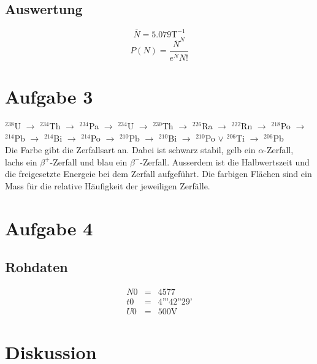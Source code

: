 \documentclass[12pt,a4paper]{article}
\begin{document}
\subsection*{Auswertung}
\[ \overline{N} = 5.079 \mbox{T}^{-1} \]
\[ P(N) = \frac{\overline{N}^N}{e^{\overline{N}}N!} \]

\section*{Aufgabe 3}
$^{238}$U $\rightarrow$  $^{234}$Th $\rightarrow$  $^{234}$Pa $\rightarrow$  $^{234}$U $\rightarrow$  $^{230}$Th $\rightarrow$  $^{226}$Ra $\rightarrow$  $^{222}$Rn $\rightarrow$  $^{218}$Po $\rightarrow$  $^{214}$Pb $\rightarrow$  $^{214}$Bi $\rightarrow$  $^{214}$Po $\rightarrow$  $^{210}$Pb $\rightarrow$  $^{210}$Bi $\rightarrow$  $^{210}$Po $\lor$  $^{206}$Ti $\rightarrow$  $^{206}$Pb  \\
Die Farbe gibt die Zerfallsart an. Dabei ist schwarz stabil, gelb ein $\alpha$-Zerfall, lachs ein $\beta^+$-Zerfall und blau ein $\beta^-$-Zerfall. Ausserdem ist die Halbwertszeit und die freigesetzte Energeie bei dem Zerfall aufgef\"uhrt. Die farbigen Fl\"achen sind ein Mass f\"ur die relative H\"aufigkeit der jeweiligen Zerf\"alle.


\section*{Aufgabe 4}
\subsection*{Rohdaten}
\begin{eqnarray*}
N0 & = & 4577 \\
t0 & = & 4\mbox{'''}42\mbox{''}29\mbox{'} \\
U0 & = & 500\mbox{V}
\end{eqnarray*}


\section*{Diskussion}
\end{document}
